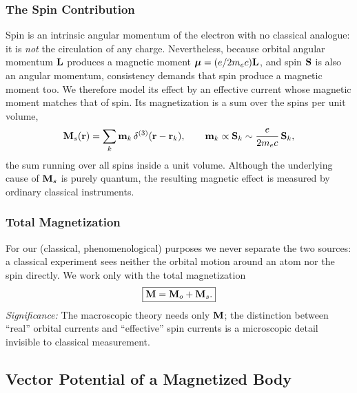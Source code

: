 \subsubsection*{The Spin Contribution}
Spin is an intrinsic angular momentum of the electron with no classical analogue: it is
\emph{not} the circulation of any charge.  Nevertheless, because orbital angular
momentum $\mathbf{L}$ produces a magnetic moment $\boldsymbol{\mu}=(e/2m_ec)\mathbf{L}$, and spin
$\mathbf{S}$ is also an angular momentum, consistency demands that spin produce a magnetic
moment too.  We therefore model its effect by an effective current whose magnetic moment
matches that of spin.  Its magnetization is a sum over the spins per unit volume,
\begin{equation}\label{eq:lec17-Ms-def}
  \mathbf{M}_s(\mathbf{r})=\sum_{k}\mathbf{m}_k\,\delta^{(3)}(\mathbf{r}-\mathbf{r}_k),
  \qquad
  \mathbf{m}_k\propto \mathbf{S}_k\sim\frac{e}{2m_ec}\,\mathbf{S}_k,
\end{equation}
the sum running over all spins inside a unit volume.  Although the underlying cause of
$\mathbf{M}_s$ is purely quantum, the resulting magnetic effect is measured by ordinary
classical instruments.


\subsubsection*{Total Magnetization}
For our (classical, phenomenological) purposes we never separate the two sources: a
classical experiment sees neither the orbital motion around an atom nor the spin
directly.  We work only with the total magnetization
\begin{equation}\label{eq:lec17-M-total}
  \boxed{\mathbf{M}=\mathbf{M}_o+\mathbf{M}_s.}
\end{equation}
\textit{Significance:} The macroscopic theory needs only $\mathbf{M}$; the distinction
between ``real'' orbital currents and ``effective'' spin currents is a microscopic
detail invisible to classical measurement.

\subsection{Vector Potential of a Magnetized Body}\label{subsec:lec17-vector-potential}

